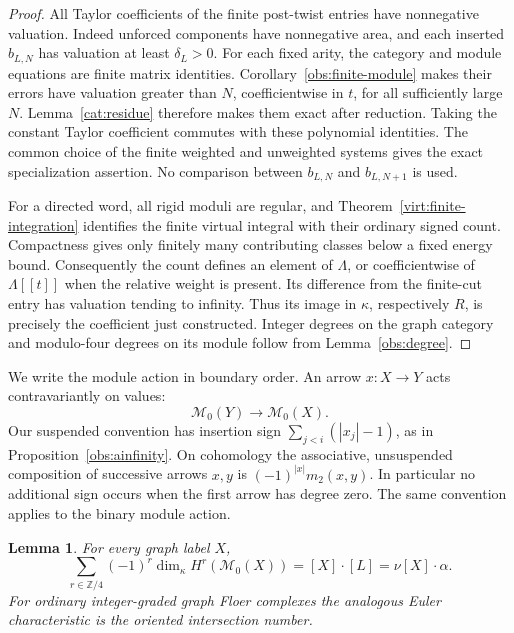 \documentclass[11pt]{article}
\newtheorem{lemma}[theorem]{Lemma}
\theoremstyle{definition}
\theoremstyle{remark}
\numberwithin{equation}{section}
\begin{document}
\begin{proof}
All Taylor coefficients of the finite post-twist entries have
nonnegative valuation.  Indeed unforced components have nonnegative
area, and each inserted \(b_{L,N}\) has valuation at least
\(\delta_L>0\).  For each fixed arity, the category and module equations
are finite matrix identities.  Corollary~\ref{obs:finite-module}
makes their errors have valuation greater than \(N\), coefficientwise
in \(t\), for all sufficiently large \(N\).
Lemma~\ref{cat:residue} therefore makes them exact after reduction.
Taking the constant Taylor coefficient commutes with these polynomial
identities.  The common choice of the finite weighted and unweighted
systems gives the exact specialization assertion.  No comparison
between \(b_{L,N}\) and \(b_{L,N+1}\) is used.

For a directed word, all rigid moduli are regular, and
Theorem~\ref{virt:finite-integration} identifies the finite virtual
integral with their ordinary signed count.  Compactness gives only
finitely many contributing classes below a fixed energy bound.
Consequently the count defines an element of \(\Lambda\), or
coefficientwise of \(\Lambda[[t]]\) when the relative weight is present.
Its difference from the finite-cut entry has valuation tending to
infinity.  Thus its image in \(\kappa\), respectively \(R\), is precisely
the coefficient just constructed.  Integer degrees on the graph
category and modulo-four degrees on its module follow from
Lemma~\ref{obs:degree}.
\end{proof}

We write the module action in boundary order.  An arrow \(x:X\to Y\)
acts contravariantly on values:
\[
 \mathcal M_0(Y)\longrightarrow\mathcal M_0(X).
\]
Our suspended convention has insertion sign
\(\sum_{j<i}(|x_j|-1)\), as in Proposition~\ref{obs:ainfinity}.
On cohomology the associative, unsuspended composition of successive
arrows \(x,y\) is \((-1)^{|x|}m_2(x,y)\).
In particular no additional sign occurs when the first arrow has degree
zero.  The same convention applies to the binary module action.

\begin{lemma}\label{cat:euler}
For every graph label \(X\),
\begin{equation}\label{cat:euler-equation}
 \sum_{r\in\mathbb Z/4}(-1)^r
       \dim_\kappa H^r(\mathcal M_0(X))
   =[X]\cdot[L]=\nu[X]\cdot\alpha.
\end{equation}
For ordinary integer-graded graph Floer complexes the analogous Euler
characteristic is the oriented intersection number.
\end{lemma}
\end{document}
